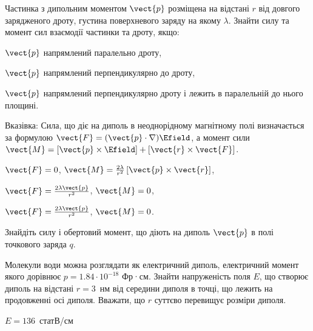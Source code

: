 \begin{problem}\label{wire-dipole}
Частинка з дипольним моментом $\vect{p}$ розміщена на відстані $r$ від довгого зарядженого дроту, густина поверхневого заряду на якому $\lambda$. Знайти силу та момент сил взаємодії частинки та дроту, якщо:
\begin{enumerate*}[label=\alph*)]
	\item $\vect{p}$ напрямлений паралельно дроту,
	\item $\vect{p}$ напрямлений перпендикулярно до дроту,
	\item $\vect{p}$ напрямлений перпендикулярно дроту і лежить в паралельній до нього площині.
\end{enumerate*}
\begin{solution}
	Вказівка: Сила, що діє на диполь в неоднорідному магнітному полі визначається за формулою $\vect{F} = (\vect{p}\cdot\nabla)\Efield$, а момент сили $\vect{M} = \left[ \vect{p}\times\Efield\right]  + \left[ \vect{r}\times\vect{F}\right] $.

	\begin{enumerate*}[label=\alph*)]
		\item $\vect{F} = 0$, $\vect{M} = \frac{2\lambda}{r^2} \left[ \vect{p}\times\vect{r}\right] $,
		\item $\vect{F} = \frac{2\lambda \vect{p}}{r^2}$, $\vect{M} = 0$,
		\item $\vect{F} = \frac{2\lambda \vect{p}}{r^2}$, $\vect{M} = 0$.
	\end{enumerate*}
\end{solution}
\end{problem}

\begin{problem}
    Знайдіть силу і обертовий момент, що діють на диполь $\vect{p}$ в полі точкового заряда $q$.
\end{problem}

\begin{problem}%
    Молекули води можна розглядати як електричний диполь, електричний момент якого дорівнює $p = 1.84 \cdot 10^{-18}$ Фр·см. Знайти напруженість поля $E$, що створює диполь на відстані $r = 3$~нм від середини диполя в точці, що лежить на продовженні осі диполя. Вважати, що $r$ суттєво перевищує розміри диполя.
\begin{solution}
$E=136$~статВ/см
\end{solution}
\end{problem}

